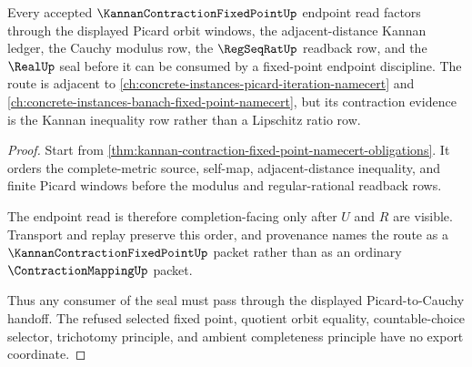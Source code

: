 \begin{theorem}
\label{thm:kannan-contraction-fixed-point-picard-cauchy-handoff}
Every accepted $\KannanContractionFixedPointUp$ endpoint read factors through the displayed Picard orbit windows, the adjacent-distance Kannan ledger, the Cauchy modulus row, the $\RegSeqRatUp$ readback row, and the $\RealUp$ seal before it can be consumed by a fixed-point endpoint discipline. The route is adjacent to \autoref{ch:concrete-instances-picard-iteration-namecert} and \autoref{ch:concrete-instances-banach-fixed-point-namecert}, but its contraction evidence is the Kannan inequality row rather than a Lipschitz ratio row.
\end{theorem}
\begin{proof}
Start from \autoref{thm:kannan-contraction-fixed-point-namecert-obligations}. It orders the complete-metric source, self-map, adjacent-distance inequality, and finite Picard windows before the modulus and regular-rational readback rows.

The endpoint read is therefore completion-facing only after $U$ and $R$ are visible. Transport and replay preserve this order, and provenance names the route as a $\KannanContractionFixedPointUp$ packet rather than as an ordinary $\ContractionMappingUp$ packet.

Thus any consumer of the seal must pass through the displayed Picard-to-Cauchy handoff. The refused selected fixed point, quotient orbit equality, countable-choice selector, trichotomy principle, and ambient completeness principle have no export coordinate.
\end{proof}




